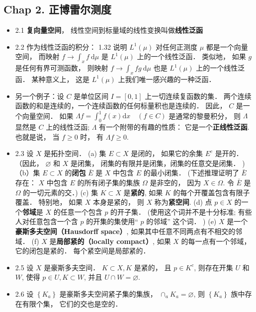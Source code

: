 \subsection{Chap 2. 正博雷尔测度}
\begin{itemize}
\item 2.1 \textbf{复向量空间}， 线性空间到标量域的线性变换叫做\textbf{线性泛函}

\item 2.2 作为线性泛函的积分： 1.32 说明 $L^1(\mu)$ 对任何正测度 $\mu$ 都是一个向量空间， 而映射 $f \rightarrow \int_{x} f \mathrm{~d} \mu$ 是 $L^1(\mu)$ 上的一个线性泛函． 类似地， 如果 $g$ 是任何有界可测函数， 则映射 $f \rightarrow \int_{x} f g \mathrm{~d} \mu$ 也是 $L^1(\mu)$ 上的一个线性泛函． 某种意义上， 这是 $L^1(\mu)$ 上我们唯一感兴趣的一种泛函．

\item 另一个例子：设 $C$ 是单位区间 $I=[0,1]$ 上一切连续复函数的集． 两个连续函数的和是连续的，一个连续函数的任何标量积也是连续的． 因此， $C$ 是一个向量空间． 如果 $\Lambda f=\int_{0}^{1} f(x) \mathrm{d} x \quad(f \in C)$ 是通常的黎曼积分， 则 $\Lambda$ 显然是 $C$ 上的线性泛函; $\Lambda$ 有一个附带的有趣的性质： 它是一个\textbf{正线性泛函}. 也就是说， 当 $f \geqslant 0$ 时， 有 $\Lambda f \geqslant 0$.

\item 2.3 设 $X$ 是拓扑空间． (a) 集 $E \subset X$ 是闭的， 如果它的余集 $E^{c}$ 是开的． （因此， $\varnothing$ 和 $X$ 是闭集， 闭集的有限并是闭集，闭集的任意交是闭集． )（b）集 $E \subset X$ 的\textbf{闭包} $\bar{E}$ 是 $X$ 中包含 $E$ 的最小闭集． (下述推理证明了 $\bar{E}$ 存在： $X$ 中包含 $E$ 的所有闭子集的集族 $\Omega$ 是非空的， 因为 $X \in \Omega$. 令 $\bar{E}$ 是 $\Omega$ 的一切元素的交．) (c) 集 $K \subset X$ 是\textbf{紧的}, 如果 $K$ 的每个开覆盖包含有限子覆盖． 特别地， 如果 $X$ 本身是紧的， 则 $X$ 称为\textbf{紧空间}. (d) 点 $p \in X$ 的一个\textbf{邻域}是 $X$ 的任意一个包含 $p$ 的开子集． (使用这个词并不是十分标准; 有些人对任意包含一个含 $p$ 的开集的集使用“ $p$ 的邻域” 这个词． ) (e) $X$ 是一个\textbf{豪斯多夫空间（Hausdorff space）}, 如果其中任意不同两点有不相交的邻域． (f) $X$ 是\textbf{局部紧的（locally compact）}, 如果 $X$ 的每一点有一个邻域， 它的闭包是紧的． 每个紧空间是局部紧的．

\item 2.5 设 $X$ 是豪斯多夫空间． $K \subset X, K$ 是紧的， 且 $p \in K^{c}$, 则存在开集 $U$ 和 $W$, 使得 $p \in U, K \subset W$, 并且 $U \cap W=\varnothing$.

\item 2.6 设 $\left\{K_{a}\right\}$ 是豪斯多夫空间紧子集的集族， $\cap_{a} K_{a}=\varnothing$, 则 $\left\{K_{a}\right\}$ 族中存在有限个集， 它们的交也是空的．


\end{itemize}

